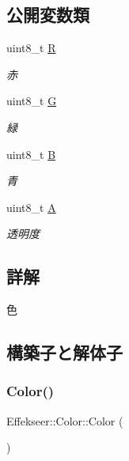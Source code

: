 \subsection*{公開変数類}
\begin{DoxyCompactItemize}
\item 
uint8\+\_\+t \mbox{\hyperlink{struct_effekseer_1_1_color_aae98e2323761b1b2b2d9d182e3af3b40}{R}}
\begin{DoxyCompactList}\small\item\em 赤 \end{DoxyCompactList}\item 
uint8\+\_\+t \mbox{\hyperlink{struct_effekseer_1_1_color_a6d82d496ac86f8ac07ec0e8710126ef9}{G}}
\begin{DoxyCompactList}\small\item\em 緑 \end{DoxyCompactList}\item 
uint8\+\_\+t \mbox{\hyperlink{struct_effekseer_1_1_color_a0313689224c549471daa2bfe58839d84}{B}}
\begin{DoxyCompactList}\small\item\em 青 \end{DoxyCompactList}\item 
uint8\+\_\+t \mbox{\hyperlink{struct_effekseer_1_1_color_a9ced071dfdca28d4da9490d24a958351}{A}}
\begin{DoxyCompactList}\small\item\em 透明度 \end{DoxyCompactList}\end{DoxyCompactItemize}


\subsection{詳解}
色 

\subsection{構築子と解体子}
\mbox{\label{struct_effekseer_1_1_color_add67be00fd9bb85ad4f3bb9f6a1b755f}} 
\subsubsection{\texorpdfstring{Color()}{Color()}\hspace{0.1cm}{\footnotesize\ttfamily [1/2]}}
{\footnotesize\ttfamily Effekseer\+::\+Color\+::\+Color (\begin{DoxyParamCaption}{ }\end{DoxyParamCaption})\hspace{0.3cm}{\ttfamily [default]}}



